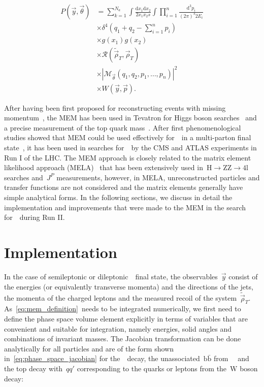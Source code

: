 \begin{align}
\label{eq:mem_definition}
P(\vec{y}, \vec{\theta}) &= \sum_{k=1}^{N_a} \int \frac{\mathrm{d}x_1 \mathrm{d}x_2}{2 x_1 x_2 s} \int \prod_{i=1}^{n} \frac{\mathrm{d}^3 p_i}{(2\pi)^3 2 E_i} \\
&\times \delta^4 (q_1 + q_2 - \sum_{i=1}^n p_i)\\
&\times g(x_1) g(x_2) \\ 
&\times \mathcal{R}(\tilde{\vec{\rho}}_T, \vec{\rho}_T) \\ 
&\times |\mathcal{M}_{\vec{\theta}}(q_1, q_2, p_1, \dots, p_n)|^2 \\
&\times W(\vec{y}, \vec{p}).
\end{align}

After having been first proposed for reconstructing events with missing momentum~\cite{Kondo:1988yd}, the MEM has been used in Tevatron for Higgs boson searches~\cite{Aaltonen:2009dh,Aaltonen:2011rt} and a precise measurement of the top quark mass~\cite{D0topmass2004}. After first phenomenological studies showed that MEM could be used effectively for~\ttH~in a multi-parton final state~\cite{Artoisenet:2013vfa}, it has been used in searches for~\ttHbb~by the CMS and ATLAS experiments in Run I of the LHC\cite{Aad:2015gra,Khachatryan:2015ila}. The MEM approach is closely related to the matrix element likelihood approach (MELA)~\cite{Gao:2010qx} that has been extensively used in~$\mathrm{H} \rightarrow \mathrm{ZZ} \rightarrow 4\mathrm{l}$ searches and~$J^P$ measurements, however, in MELA, unreconstructed particles and transfer functions are not considered and the matrix elements generally have simple analytical forms.
In the following sections, we discuss in detail the implementation and improvements that were made to the MEM in the search for~\ttHbb~during Run II.

\section{Implementation}
\label{sec:mem_implementation}
In the case of semileptonic or dileptonic~\ttH~final state, the observables~$\vec{y}$ consist of the energies (or equivalently transverse momenta) and the directions of the jets, the momenta of the charged leptons and the measured recoil of the system~$\tilde{\vec{\rho}}_T$. As~\cref{eq:mem_definition}~needs to be integrated numerically, we first need to define the phase space volume element explicitly in terms of variables that are convenient and suitable for integration, namely energies, solid angles and combinations of invariant masses. The Jacobian transformation can be done analytically for all particles and are of the form shown in~\cref{eq:phase_space_jacobian} for the~\Hbb~decay, the unassociated~$\mathrm{b}\bar{\mathrm{b}}$ from~\ttbb~ and the top decay with~$qq'$ corresponding to the quarks or leptons from the~$\mathrm{W}$ boson decay:

